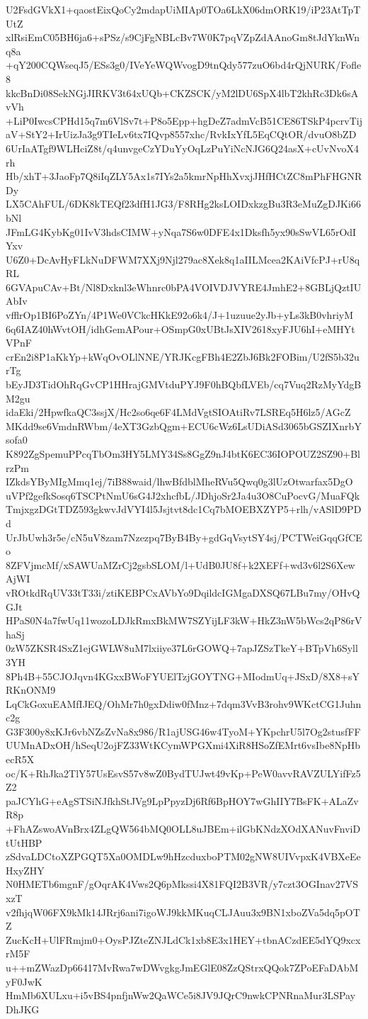 U2FsdGVkX1+qaostEixQoCy2mdapUiMIAp0TOa6LkX06dmORK19/iP23AtTpTUtZ
xlRsiEmC05BH6ja6+sPSz/s9CjFgNBLcBv7W0K7pqVZpZdAAnoGm8tJdYknWnq8a
+qY200CQWseqJ5/ESs3g0/IVeYeWQWvogD9tnQdy577zuO6bd4rQjNURK/Fofle8
kkcBnDi08SekNGjJIRKV3t64xUQb+CKZSCK/yM2lDU6SpX4lbT2khRc3Dk6sAvVh
+LiP0IwcsCPHd15q7m6VlSv7t+P8o5Epp+hgDeZ7admVcB51CE86TSkP4pcrvTij
aV+StY2+IrUizJa3g9TIeLv6tx7IQvp8557xhc/RvkIxYfL5EqCQtOR/dvuO8bZD
6UrIaATgf9WLHciZ8t/q4unvgeCzYDuYyOqLzPuYiNcNJG6Q24asX+cUvNvoX4rh
Hb/xhT+3JaoFp7Q8iIqZLY5Ax1s7IYs2a5kmrNpHhXvxjJHfHCtZC8mPhFHGNRDy
LX5CAhFUL/6DK8kTEQf23dfH1JG3/F8RHg2ksLOIDxkzgBu3R3eMuZgDJKi66bNl
JFmLG4KybKg01IvV3hdsCIMW+yNqa7S6w0DFE4x1Dksfh5yx90sSwVL65rOdIYxv
U6Z0+DcAvHyFLkNuDFWM7XXj9Njl279ac8Xek8q1aIILMcea2KAiVfcPJ+rU8qRL
6GVApuCAv+Bt/Nl8Dxknl3eWhnrc0bPA4VOIVDJVYRE4JmhE2+8GBLjQztIUAbIv
vfflrOp1BI6PoZYn/4P1We0VCkcHKkE92o6k4/J+1uzuue2yJb+yLs3kB0vhriyM
6q6IAZ40hWvtOH/idhGemAPour+OSmpG0xUBtJsXIV2618xyFJU6hI+eMHYtVPnF
crEn2i8P1aKkYp+kWqOvOLlNNE/YRJKcgFBh4E2ZbJ6Bk2FOBim/U2fS5b32urTg
bEyJD3TidOhRqGvCP1HHrajGMVtduPYJ9F0hBQbfLVEb/cq7Vuq2RzMyYdgBM2gu
idaEki/2HpwfkaQC3ssjX/Hc2so6qe6F4LMdVgtSIOAtiRv7LSREq5H6lz5/AGcZ
MKdd9se6VmdnRWbm/4eXT3GzbQgm+ECU6cWz6LsUDiASd3065bGSZIXnrbYsofa0
K892ZgSpemuPPcqTbOm3HY5LMY34Ss8GgZ9nJ4btK6EC36IOPOUZ2SZ90+BlrzPm
IZkdsYByMIgMmq1ej/7iB88waid/lhwBfdblMheRVu5Qwq0g3lUzOtwarfax5DgO
uVPf2gefkSosq6TSCPtNmU6sG4J2xhcfbL/JDhjoSr2Ja4u3O8CuPocvG/MuaFQk
TmjxgzDGtTDZ593gkwvJdVYI4l5Jsjtvt8dc1Cq7bMOEBXZYP5+rlh/vASlD9PDd
UrJbUwh3r5e/cN5uV8zam7Nzezpq7ByB4By+gdGqVsytSY4sj/PCTWeiGqqGfCEo
8ZFVjmcMf/xSAWUaMZrCj2gsbSLOM/l+UdB0JU8f+k2XEFf+wd3v6l2S6XewAjWI
vROtkdRqUV33tT33i/ztiKEBPCxAVbYo9DqildcIGMgaDXSQ67LBu7my/OHvQGJt
HPaS0N4a7fwUq11wozoLDJkRmxBkMW7SZYijLF3kW+HkZ3nW5bWcs2qP86rVhaSj
0zW5ZKSR4SxZ1ejGWLW8uM7lxiiye37L6rGOWQ+7apJZSzTkeY+BTpVh6Syll3YH
8Ph4B+55CJOJqvn4KGxxBWoFYUElTzjGOYTNG+MIodmUq+JSxD/8X8+sYRKnONM9
LqCkGoxuEAMfIJEQ/OhMr7h0gxDdiw0fMnz+7dqm3VvB3rohv9WKctCG1Juhnc2g
G3F300y8xKJr6vbNZsZvNa8x986/R1ajUSG46w4TyoM+YKpchrU5l7Og2stusfFF
UUMnADxOH/hSeqU2ojFZ33WtKCymWPGXmi4XiR8HSoZfEMrt6vsIbe8NpHbecR5X
oc/K+RhJka2TlY57UsEsvS57v8wZ0BydTUJwt49vKp+PeW0avvRAVZULYifFz5Z2
paJCYhG+eAgSTSiNJfkhStJVg9LpPpyzDj6Rf6BpHOY7wGhIIY7BsFK+ALaZvR8p
+FhAZswoAVnBrx4ZLgQW564bMQ0OLL8uJBEm+ilGbKNdzXOdXANuvFnviDtUtHBP
zSdvaLDCtoXZPGQT5Xa0OMDLw9hHzcduxboPTM02gNW8UIVvpxK4VBXeEeHxyZHY
N0HMETb6mgnF/gOqrAK4Vws2Q6pMkssi4X81FQI2B3VR/y7czt3OGInav27VSxzT
v2fhjqW06FX9kMk14JRrj6ani7igoWJ9kkMKuqCLJAuu3x9BN1xboZVa5dq5pOTZ
ZucKcH+UlFRmjm0+OysPJZteZNJLdCk1xb8E3x1HEY+tbnACzdEE5dYQ9xcxrM5F
u++mZWazDp66417MvRwa7wDWvgkgJmEGlE08ZzQStrxQQok7ZPoEFaDAbMyF0JwK
HmMb6XULxu+i5vBS4pnfjnWw2QaWCe5i8JV9JQrC9nwkCPNRnaMur3LSPayDhJKG
